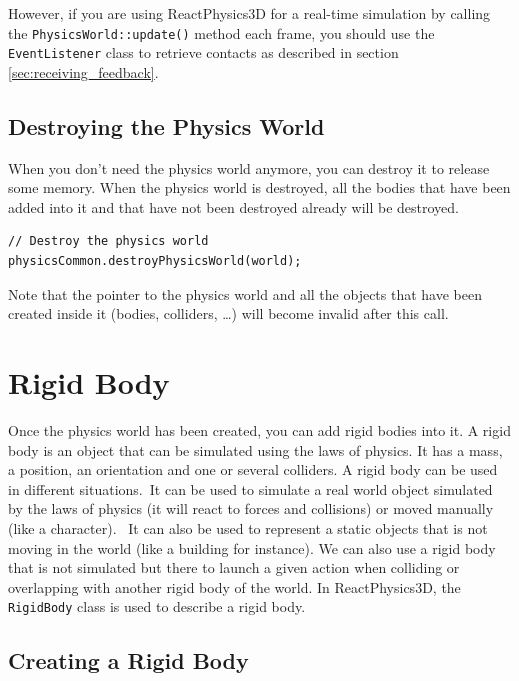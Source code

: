 \documentclass[a4paper,12pt]{article}
\begin{document}
    However, if you are using ReactPhysics3D for a real-time simulation by calling the \texttt{PhysicsWorld::update()} method each frame, you should
    use the \texttt{EventListener} class to retrieve contacts as described in section \ref{sec:receiving_feedback}.

    \subsection{Destroying the Physics World}

    When you don't need the physics world anymore, you can destroy it to release some memory. 
    When the physics world is destroyed, all the bodies that have been added into it and that have not been destroyed already will
    be destroyed. \\

    \begin{lstlisting}
// Destroy the physics world
physicsCommon.destroyPhysicsWorld(world);
    \end{lstlisting}

    \vspace{0.6cm}

    Note that the pointer to the physics world and all the objects that have been created inside it (bodies, colliders, \dots) will become invalid after
    this call.

    \section{Rigid Body}
    \label{sec:rigidbody}

    Once the physics world has been created, you can add rigid bodies into it. A rigid body is an object that can be simulated using the laws of physics.
    It has a mass, a position, an orientation and one or several colliders. A rigid body can be used in different situations. It can be used to simulate a
    real world object simulated by the laws of physics (it will react to forces and collisions) or moved manually (like a character).  It can also be used
    to represent a static objects that is not moving in the world (like a building for instance). We can also use a rigid body that is not simulated but
    there to launch a given action when colliding or overlapping with another rigid body of the world. In ReactPhysics3D, the \texttt{RigidBody} class
    is used to describe a rigid body.

    \subsection{Creating a Rigid Body}
\end{document}
